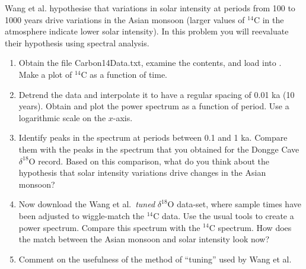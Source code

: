 \documentclass[12pt,twoside,a4paper]{article}
\begin{document}
\begin{enumerate}
  Wang et al. hypothesise that variations in solar intensity at
  periods from 100 to 1000 years drive variations in the Asian monsoon
  (larger values of $^{14}$C in the atmosphere indicate lower solar
  intensity).  In this problem you will reevaluate their hypothesis
  using spectral analysis.
  \begin{enumerate}
  \item Obtain the file Carbon14Data.txt, examine the contents, and
    load into \Mlab. Make a plot of $^{14}$C as a function of time.
  \item Detrend the data and interpolate it to have a regular spacing
    of 0.01 ka (10 years).  Obtain and plot the power spectrum as a
    function of period. Use a logarithmic scale on the $x$-axis.
  \item Identify peaks in the spectrum at periods between 0.1 and 1
    ka.  Compare them with the peaks in the spectrum that you obtained
    for the Dongge Cave $\delta^{18}$O record.  Based on this
    comparison, what do you think about the hypothesis that solar
    intensity variations drive changes in the Asian monsoon?
  \item Now download the Wang et al.~\textit{tuned} $\delta^{18}$O
    data-set, where sample times have been adjusted to wiggle-match
    the $^{14}$C data. Use the usual tools to create a power spectrum.
    Compare this spectrum with the $^{14}$C spectrum.  How does the
    match between the Asian monsoon and solar intensity look now?
  \item Comment on the usefulness of the method of ``tuning'' used by
    Wang et al.
  \end{enumerate}
\end{enumerate}
\end{document}
